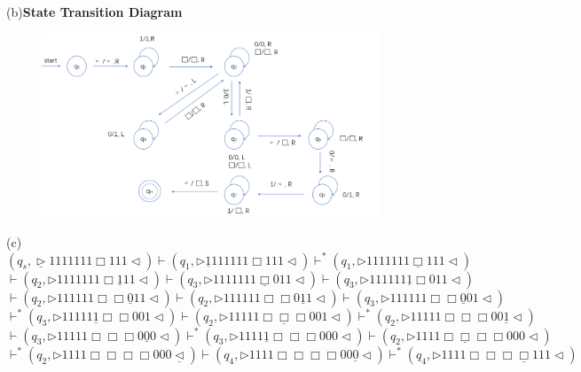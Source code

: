 \documentclass[12pt,a4paper]{article}
\theoremstyle{definition}
\begin{document}
\begin{enumerate}
(b)\textbf{State Transition Diagram}
\begin{figure}[H] 
    \centering 
    \includegraphics[width=0.9\textwidth]{2} 

\end{figure}
(c)
$$(q_s,\underline{\triangleright}  1  1  1  1  1  1  1  \Box 1  1  1   \triangleleft)
\vdash (q_1,\triangleright  \underline{1}  1  1  1  1  1  1  \Box 1  1  1   \triangleleft)
\vdash^* (q_1,\triangleright  1  1  1  1  1  1  1  \underline{\Box} 1  1  1   \triangleleft)$$
$$\vdash (q_2,\triangleright  1  1  1  1  1  1  1  \Box \underline{1}  1  1   \triangleleft)
\vdash (q_3,\triangleright  1  1  1  1  1  1  1  \underline{\Box} 0  1  1   \triangleleft)
\vdash (q_3,\triangleright  1  1  1  1  1  1  \underline{1}  \Box 0  1  1   \triangleleft)$$
$$\vdash (q_2,\triangleright  1  1  1  1  1  1  \Box  \Box \underline{0}  1  1   \triangleleft)
\vdash (q_2,\triangleright  1  1  1  1  1  1  \Box  \Box 0  \underline{1}  1   \triangleleft)
\vdash (q_3,\triangleright  1  1  1  1  1  1  \Box  \Box \underline{0}  0  1   \triangleleft)$$
$$\vdash^* (q_3,\triangleright  1  1  1  1  1  \underline{1}  \Box  \Box 0  0  1   \triangleleft)
\vdash (q_2,\triangleright  1  1  1  1  1  \Box  \underline{\Box}  \Box 0  0  1   \triangleleft)
\vdash^* (q_2,\triangleright  1  1  1  1  1  \Box  \Box  \Box 0  0  \underline{1}   \triangleleft)$$
$$\vdash (q_3,\triangleright  1  1  1  1  1  \Box  \Box  \Box 0  \underline{0}  0   \triangleleft)
\vdash^* (q_3,\triangleright  1  1  1  1  \underline{1}  \Box  \Box  \Box 0  0  0   \triangleleft)
\vdash (q_2,\triangleright  1  1  1  1  \Box  \underline{\Box}  \Box  \Box 0  0  0   \triangleleft)$$
$$\vdash^* (q_2,\triangleright  1  1  1  1  \Box  \Box  \Box  \Box 0  0  0   \underline{\triangleleft})
\vdash (q_4,\triangleright  1  1  1  1  \Box  \Box  \Box  \Box 0  0  \underline{0}   \triangleleft)
\vdash^* (q_4,\triangleright  1  1  1  1  \Box  \Box  \Box  \underline{\Box} 1  1  1   \triangleleft)$$

\end{enumerate}
\end{document}
